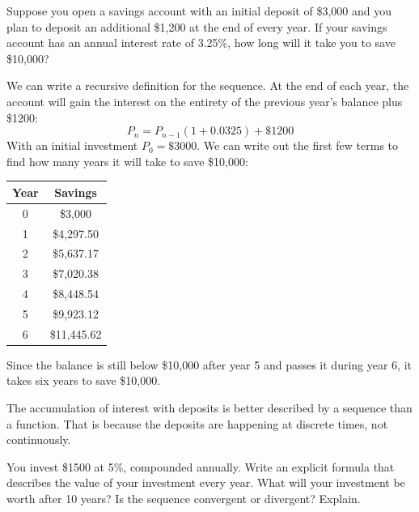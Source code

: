 \begin{Worked}
\begin{Problem}
Suppose you open a savings account with an initial deposit
of \$3,000 and you plan to deposit an additional \$1,200 at the end of every
year. If your savings account has an annual interest rate of 3.25\%, how long
will it take you to save \$10,000?
\end{Problem}
\begin{Solution}
We can write a recursive definition for the sequence. At
the end of each year, the account will gain the interest on the entirety of
the previous year's balance plus \$1200:
$$P_n = P_{n-1}(1+0.0325) + \$1200$$
With an initial investment $P_0 = \$3000$. We can write out the first few terms
to find how many years it will take to save \$10,000:
\begin{center}
    \begin{tabular}{|c|c|}\hline
        Year & Savings     \\
        \hline
        0    & \$3,000     \\
        \hline
        1    & \$4,297.50  \\
        \hline
        2    & \$5,637.17  \\
        \hline
        3    & \$7,020.38  \\
        \hline
        4    & \$8,448.54  \\
        \hline
        5    & \$9,923.12  \\
        \hline
        6    & \$11,445.62 \\
        \hline
    \end{tabular}
\end{center}

Since the balance is still below \$10,000 after year 5 and passes it during year 6, it takes six years to save \$10,000.
\end{Solution}
\end{Worked}

The accumulation of interest with deposits is better described by a sequence than a function. That is because the deposits are happening at discrete times, not continuously.

\begin{Exercise}[label=seqcalc5]
    You invest \$1500 at 5\%, compounded annually. Write an explicit formula that
    describes the value of your investment every year. What will your investment
    be worth after 10 years? Is the sequence convergent or divergent? Explain.
\end{Exercise}

